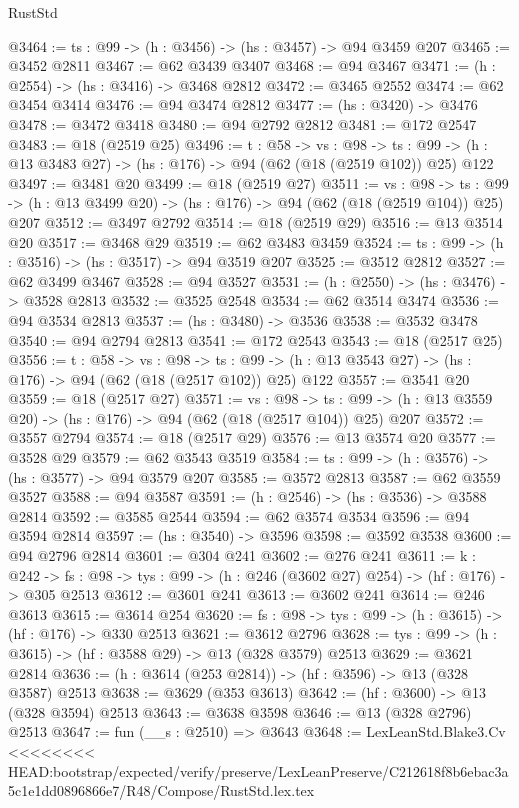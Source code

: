 \begin{lexlean}{RustStd}
\begin{coremodule}
{\begin{coremodule}
{{{{{{{{{{{@3464 := {ts : @99} -> (h : @3456) -> (hs : @3457) -> @94 @3459 @207
@3465 := @3452 @2811
@3467 := @62 @3439 @3407
@3468 := @94 @3467
@3471 := (h : @2554) -> (hs : @3416) -> @3468 @2812
@3472 := @3465 @2552
@3474 := @62 @3454 @3414
@3476 := @94 @3474 @2812
@3477 := (hs : @3420) -> @3476
@3478 := @3472 @3418
@3480 := @94 @2792 @2812
@3481 := @172 @2547
@3483 := @18 (@2519 @25)
@3496 := {t : @58} ->
  {vs : @98} ->
  {ts : @99} -> (h : @13 @3483 @27) -> (hs : @176) -> @94 (@62 (@18 (@2519 @102)) @25) @122
@3497 := @3481 @20
@3499 := @18 (@2519 @27)
@3511 := {vs : @98} ->
  {ts : @99} -> (h : @13 @3499 @20) -> (hs : @176) -> @94 (@62 (@18 (@2519 @104)) @25) @207
@3512 := @3497 @2792
@3514 := @18 (@2519 @29)
@3516 := @13 @3514 @20
@3517 := @3468 @29
@3519 := @62 @3483 @3459
@3524 := {ts : @99} -> (h : @3516) -> (hs : @3517) -> @94 @3519 @207
@3525 := @3512 @2812
@3527 := @62 @3499 @3467
@3528 := @94 @3527
@3531 := (h : @2550) -> (hs : @3476) -> @3528 @2813
@3532 := @3525 @2548
@3534 := @62 @3514 @3474
@3536 := @94 @3534 @2813
@3537 := (hs : @3480) -> @3536
@3538 := @3532 @3478
@3540 := @94 @2794 @2813
@3541 := @172 @2543
@3543 := @18 (@2517 @25)
@3556 := {t : @58} ->
  {vs : @98} ->
  {ts : @99} -> (h : @13 @3543 @27) -> (hs : @176) -> @94 (@62 (@18 (@2517 @102)) @25) @122
@3557 := @3541 @20
@3559 := @18 (@2517 @27)
@3571 := {vs : @98} ->
  {ts : @99} -> (h : @13 @3559 @20) -> (hs : @176) -> @94 (@62 (@18 (@2517 @104)) @25) @207
@3572 := @3557 @2794
@3574 := @18 (@2517 @29)
@3576 := @13 @3574 @20
@3577 := @3528 @29
@3579 := @62 @3543 @3519
@3584 := {ts : @99} -> (h : @3576) -> (hs : @3577) -> @94 @3579 @207
@3585 := @3572 @2813
@3587 := @62 @3559 @3527
@3588 := @94 @3587
@3591 := (h : @2546) -> (hs : @3536) -> @3588 @2814
@3592 := @3585 @2544
@3594 := @62 @3574 @3534
@3596 := @94 @3594 @2814
@3597 := (hs : @3540) -> @3596
@3598 := @3592 @3538
@3600 := @94 @2796 @2814
@3601 := @304 @241
@3602 := @276 @241
@3611 := {k : @242} ->
  {fs : @98} -> {tys : @99} -> (h : @246 (@3602 @27) @254) -> (hf : @176) -> @305 @2513
@3612 := @3601 @241
@3613 := @3602 @241
@3614 := @246 @3613
@3615 := @3614 @254
@3620 := {fs : @98} -> {tys : @99} -> (h : @3615) -> (hf : @176) -> @330 @2513
@3621 := @3612 @2796
@3628 := {tys : @99} -> (h : @3615) -> (hf : @3588 @29) -> @13 (@328 @3579) @2513
@3629 := @3621 @2814
@3636 := (h : @3614 (@253 @2814)) -> (hf : @3596) -> @13 (@328 @3587) @2513
@3638 := @3629 (@353 @3613)
@3642 := (hf : @3600) -> @13 (@328 @3594) @2513
@3643 := @3638 @3598
@3646 := @13 (@328 @2796) @2513
@3647 := fun (__s : @2510) => @3643
@3648 := LexLeanStd.Blake3.Cv
<<<<<<<< HEAD:bootstrap/expected/verify/preserve/LexLeanPreserve/C212618f8b6ebac3a5c1e1dd0896866e7/R48/Compose/RustStd.lex.tex
}}}}}}}}}}}
\end{coremodule}}
\end{coremodule}
\end{lexlean}
